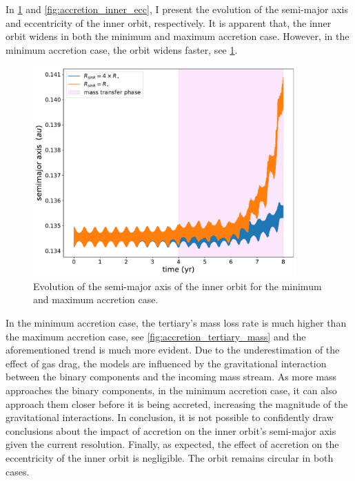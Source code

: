 In \cref{fig:accretion_inner_semimajor_axis} and \cref{fig:accretion_inner_ecc}, I present the evolution of the semi-major axis and eccentricity of the inner orbit, 
respectively. It is apparent that, the inner orbit widens in both the minimum and maximum accretion case. However, in the minimum accretion case, the orbit widens faster, see \cref{fig:accretion_inner_semimajor_axis}.
\begin{figure}[H]
    \centering
    \includegraphics[width=0.9\textwidth]{Thesis/graphs/accretion_case/accretion_inner_semimajor_axis.pdf}
    \caption{Evolution of the semi-major axis of the inner orbit for the minimum and maximum accretion case.}
    \label{fig:accretion_inner_semimajor_axis}
\end{figure}
In the minimum accretion case, the tertiary's mass loss rate is much higher than the maximum accretion case, see \cref{fig:accretion_tertiary_mass} and the aforementioned trend is much more evident. Due to the underestimation of the effect of gas drag, the models are influenced by the gravitational interaction between the binary components and the incoming mass stream. As more mass approaches the binary components, in the minimum accretion case, it can also approach them closer before it is being accreted, increasing the magnitude of the gravitational interactions. In conclusion, it is not possible to confidently draw conclusions about the impact of accretion on the inner orbit's semi-major axis given the current resolution. Finally, as expected, the effect of accretion on the eccentricity of the inner orbit is negligible. The orbit remains circular in both cases.
